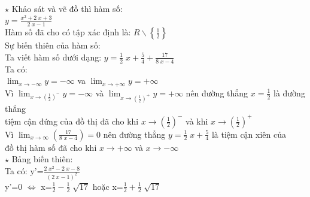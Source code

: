 \documentclass[17pt]{extarticle}
\begin{document}
\everymath{\displaystyle}
$\star$ Khảo sát và vẽ đồ thì hàm số: \\
$y=\frac{x^{2} + 2 \; x + 3}{2 \; x - 1}$\\
 Hàm số đã cho có tập xác định là: $R\backslash\left\{\frac{1}{2}\right\}$\\
 Sự biến thiên của hàm số:\\
	Ta viết hàm số dưới dạng: $y=\frac{1}{2} \; x + \frac{5}{4}+\frac{17}{8 \; x - 4}$\\
 Ta có: \\
$\lim_{x\to -\infty }y=-\infty$ va $\lim_{x\to+\infty }y=+\infty$\\
 Vì $\lim_{x\to(\frac{1}{2})^{-} }y=-\infty$ và $\lim_{x\to(\frac{1}{2})^{+} }y=+\infty$ nên đường thẳng $x=\frac{1}{2}$ là đường thẳng\\
tiệm cận đứng của đồ thị đã cho khi $x\to(\frac{1}{2})^{-}$ và khi $x\to(\frac{1}{2})^{+}$\\
 Vì $\lim_{x\to\infty}(\frac{17}{8 \; x - 4})=0$ nên đường thẳng $y=\frac{1}{2} \; x + \frac{5}{4}$ là tiệm cận xiên của\\
 đồ thị hàm số đã cho khi $x\to+\infty$ và $x\to-\infty$\\
$\star$ Bảng biến thiên:\\
 Ta có: y'=$\frac{2 \; x^{2} - 2 \; x - 8}{\left(2 \; x - 1\right)^{2}}$ \\
	y'=0 $\Leftrightarrow$ x=$\frac{1}{2} - \frac{1}{2} \; \sqrt{17}$ hoặc x=$\frac{1}{2} + \frac{1}{2} \; \sqrt{17}$ \\
\end{document}
